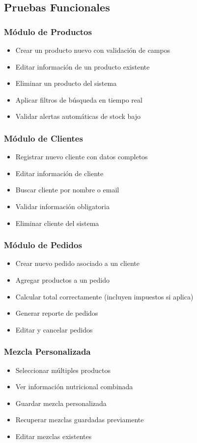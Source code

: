 \documentclass[12pt,a4paper]{report}
\begin{document}
\subsection{Pruebas Funcionales}

\subsubsection{Módulo de Productos}
\begin{itemize}
    \item Crear un producto nuevo con validación de campos
    \item Editar información de un producto existente
    \item Eliminar un producto del sistema
    \item Aplicar filtros de búsqueda en tiempo real
    \item Validar alertas automáticas de stock bajo
\end{itemize}

\subsubsection{Módulo de Clientes}
\begin{itemize}
    \item Registrar nuevo cliente con datos completos
    \item Editar información de cliente
    \item Buscar cliente por nombre o email
    \item Validar información obligatoria
    \item Eliminar cliente del sistema
\end{itemize}

\subsubsection{Módulo de Pedidos}
\begin{itemize}
    \item Crear nuevo pedido asociado a un cliente
    \item Agregar productos a un pedido
    \item Calcular total correctamente (incluyen impuestos si aplica)
    \item Generar reporte de pedidos
    \item Editar y cancelar pedidos
\end{itemize}

\subsubsection{Mezcla Personalizada}
\begin{itemize}
    \item Seleccionar múltiples productos
    \item Ver información nutricional combinada
    \item Guardar mezcla personalizada
    \item Recuperar mezclas guardadas previamente
    \item Editar mezclas existentes
\end{itemize}
\end{document}
